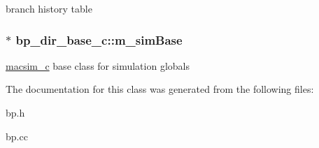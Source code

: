 \label{classbp__dir__base__c_a8b2a7a886fa7bd761f9ed85dc3d3eb30}
branch history table \hypertarget{classbp__dir__base__c_a8d9e0f72bab48735f49fab60bd2fe0df}{
\subsubsection[{m\_\-simBase}]{$\ast$ {\bf bp\_\-dir\_\-base\_\-c::m\_\-simBase}}}
\label{classbp__dir__base__c_a8d9e0f72bab48735f49fab60bd2fe0df}
\hyperlink{classmacsim__c}{macsim\_\-c} base class for simulation globals 

The documentation for this class was generated from the following files:\begin{DoxyCompactItemize}
\item 
bp.h\item 
bp.cc\end{DoxyCompactItemize}
